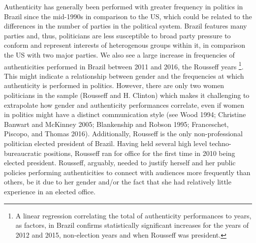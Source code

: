 \documentclass[smallextended]{svjour3}       %
\begin{document}
Authenticity has generally been performed with greater frequency in
politics in Brazil since the mid-1990s in comparison to the US, which
could be related to the differences in the number of parties in the
political system. Brazil features many parties and, thus, politicians
are less susceptible to broad party pressure to conform and represent
interests of heterogenous groups within it, in comparison the US with
two major parties. We also see a large increase in frequencies of
authenticities performed in Brazil between 2011 and 2016, the Rousseff
years \footnote{ A linear regression correlating the total of
  authenticity performances to years, as factors, in Brazil confirms
  statistically significant increases for the years of 2012 and 2015,
  non-election years and when Rousseff was president.}. This might
indicate a relationship between gender and the frequencies at which
authenticity is performed in politics. However, there are only two women
politicians in the sample (Rousseff and H. Clinton) which makes it
challenging to extrapolate how gender and authenticity performances
correlate, even if women in politics might have a distinct communication
style (see Wood 1994; Christine Banwart and McKinney 2005; Blankenship
and Robson 1995; Franceschet, Piscopo, and Thomas 2016). Additionally,
Rousseff is the only non-professional politician elected president of
Brazil. Having held several high level techno-bureaucratic positions,
Rousseff ran for office for the first time in 2010 being elected
president. Rousseff, arguably, needed to justify herself and her public
policies performing authenticities to connect with audiences more
frequently than others, be it due to her gender and/or the fact that she
had relatively little experience in an elected office.
\end{document}
